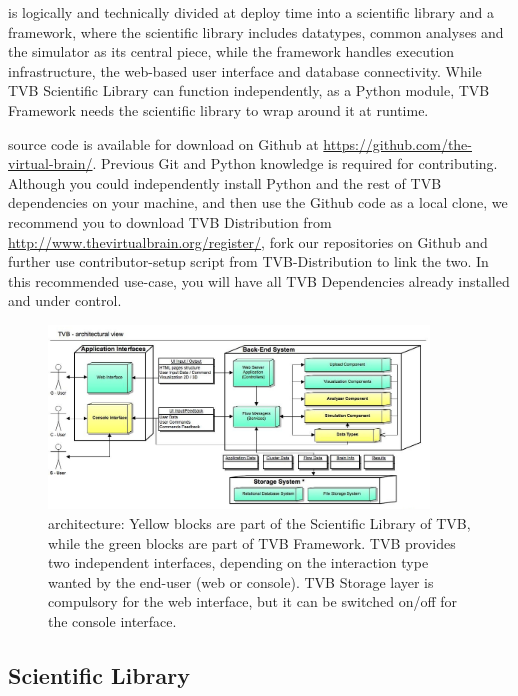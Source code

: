 
\TVB is logically and technically divided at deploy time into a scientific library and a framework, 
where the scientific library includes datatypes, common analyses and the simulator as its central piece,
while the framework handles execution infrastructure, the web-based user interface and database connectivity. 
While TVB Scientific Library can function independently, as a Python module, TVB Framework needs the scientific library to wrap around it at runtime.

\TVB source code is available for download on Github at \url{https://github.com/the-virtual-brain/}. Previous Git and Python knowledge is required for contributing.
Although you could independently install Python and the rest of TVB dependencies on your machine, and then use the Github code as a local clone, 
we recommend you to download TVB Distribution from \url{http://www.thevirtualbrain.org/register/}, fork our repositories on Github and further use
contributor-setup script from TVB-Distribution to link the two. In this recommended use-case, you will have all TVB Dependencies already installed 
 and under control.

 \begin{figure}
        \centering
        \includegraphics[width=0.90\textwidth]{images/architecture.jpg}
        \caption{\TVB architecture: 
        Yellow blocks are part of the Scientific Library of TVB, while the green blocks are part of TVB Framework.
        TVB provides two independent interfaces, depending on the interaction type wanted by the end-user (web or console).
        TVB Storage layer is compulsory for the web interface, but it can be switched on/off for the console interface.
         }
        \label{fig:architecture}
 \end{figure}


	\subsection{\TVB Scientific Library}

